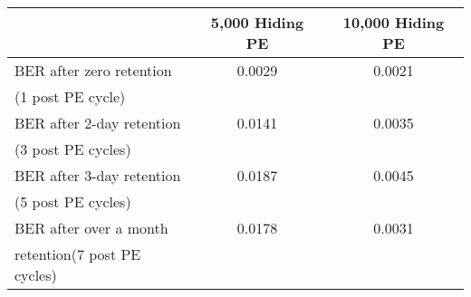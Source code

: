\begin{tabular}{|l|c|c|}
\hline

  & 5,000 Hiding PE & 10,000 Hiding PE \\

\hline
BER after zero retention  & 0.0029 & 0.0021 \\
(1 post PE cycle) & &\\
\hline
BER after 2-day retention &  0.0141 & 0.0035 \\
(3 post PE cycles) & &\\
\hline
BER after 3-day retention & 0.0187 & 0.0045 \\
(5 post PE cycles) & &\\
\hline
BER after over a month & 0.0178 & 0.0031 \\
retention(7 post PE cycles) & &\\
 \hline

\end{tabular}


